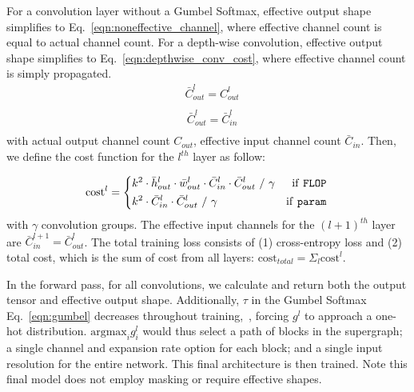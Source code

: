 \documentclass[10pt,twocolumn,letterpaper]{article}
\begin{document}
For a convolution layer without a Gumbel Softmax, effective output shape simplifies to Eq.~\ref{eqn:noneffective_channel}, where effective channel count is equal to actual channel count. For a depth-wise convolution, effective output shape simplifies to Eq.~\ref{eqn:depthwise_conv_cost}, where effective channel count is simply propagated.
\begin{equation}
\label{eqn:noneffective_channel}
\begin{split}
    & \bar{C}^{l}_{out} =  C^{l}_{out} \\
\end{split}
\end{equation}
\begin{equation}
\label{eqn:depthwise_conv_cost}
\begin{split}
    & \bar{C}^{l}_{out} = \bar{C}^{l}_{in} \\
\end{split}
\end{equation}
with actual output channel count $C_{out}$, effective input channel count $\bar{C}_{in}$. Then, we define the cost function for the $l^{th}$ layer as follow:

\begin{equation}
\text{cost}^{l} = 
    \left\{ 
    \begin{aligned}
    & k^{2}\cdot \bar{h}^{l}_{out} \cdot \bar{w}^{l}_{out} \cdot \bar{C}^{l}_{in}\cdot \bar{C}^{l}_{out}\ /\ \gamma & \text{if \texttt{FLOP}}\\
    & k^{2} \cdot \bar{C}^{l}_{in}\cdot \bar{C}^{l}_{out}\ /\ \gamma & \text{if \texttt{param}}
    \end{aligned}
    \right. \\
\end{equation}
with $\gamma$ convolution groups. The effective input channels for the $(l+1)^{th}$ layer are $\bar{C}^{l+1}_{in} = \bar{C}^{l}_{out}$. The total training loss consists of (1) cross-entropy loss and (2) total cost, which is the sum of cost from all layers: 
$\text{cost}_{total} = \Sigma_{l} \text{cost}^{l}$.

In the forward pass, for all convolutions, we calculate and return both the output tensor and effective output shape. Additionally, $\tau$ in the Gumbel Softmax Eq.~\ref{eqn:gumbel} decreases throughout training,~\cite{gumbel}, forcing $g^{l}$ to approach a one-hot distribution. $\text{argmax}_i g^{l}_i$ would thus select a path of blocks in the supergraph; a single channel and expansion rate option for each block; and a single input resolution for the entire network. This final architecture is then trained. Note this final model does not employ masking or require effective shapes. 
\end{document}
